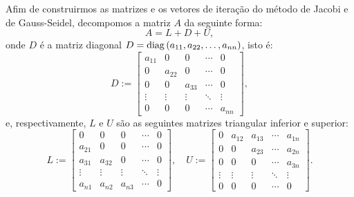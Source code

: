 Afim de construirmos as matrizes e os vetores de iteração do método de Jacobi e de Gauss-Seidel, decompomos a matriz $A$ da seguinte forma:
\begin{equation*}
  A = L + D + U,
\end{equation*}
onde $D$ é a matriz diagonal $D = \operatorname{diag}\,(a_{11}, a_{22}, \ldots, a_{nn})$, isto é:
\begin{equation*}
  D := \begin{bmatrix}
    a_{11} & 0 & 0 & \cdots & 0\\
    0 & a_{22} & 0 & \cdots & 0\\
    0 & 0 & a_{33} & \cdots & 0\\
    \vdots & \vdots & \vdots & \ddots & \vdots\\
    0 & 0 & 0 & \cdots & a_{nn}
  \end{bmatrix},
\end{equation*}
e, respectivamente, $L$ e $U$ são as seguintes matrizes triangular inferior e superior:
\begin{equation*}
  L := \begin{bmatrix}
    0 & 0 & 0 & \cdots & 0\\
    a_{21} & 0 & 0 & \cdots & 0\\
    a_{31} & a_{32} & 0 &\cdots & 0\\
    \vdots & \vdots & \vdots & \ddots & \vdots\\
    a_{n1} & a_{n2} & a_{n3} & \cdots & 0
  \end{bmatrix},\quad
  U := \begin{bmatrix}
    0 & a_{12} & a_{13} & \cdots & a_{1n}\\
    0 & 0 & a_{23} & \cdots & a_{2n}\\
    0 & 0 & 0 & \cdots & a_{3n}\\
    \vdots & \vdots & \vdots & \ddots & \vdots\\
    0 & 0 & 0 & \cdots & 0
  \end{bmatrix}.
\end{equation*}

